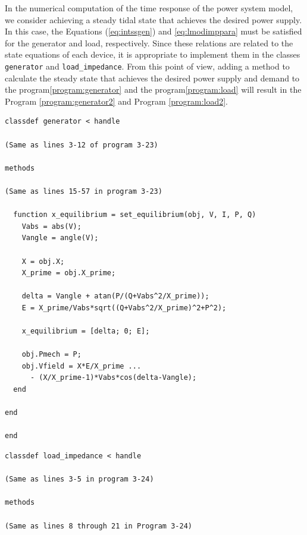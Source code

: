 \documentclass[tombow,dvipdfmx]{corona-a5-1.1}
\begin{document}
\begin{例}
In the numerical computation of the time response of the power system model, we consider achieving a steady tidal state that achieves the desired power supply.
In this case, the Equations (\ref{eq:intssgen}) and \ref{eq:lmodimppara} must be satisfied for the generator and load, respectively.
Since these relations are related to the state equations of each device, it is appropriate to implement them in the classes \verb|generator| and \verb|load_impedance|.
From this point of view, adding a method to calculate the steady state that achieves the desired power supply and demand to the program\ref{program:generator} and the program\ref{program:load} will result in the Program \nobreak\ref{program:generator2} and Program \ref{program:load2}.

\smallskip
\begin{PROGRAMA}[count,title={generator.m}]\label{program:generator2}
  \begin{verbatim}
classdef generator < handle
  
(Same as lines 3-12 of program 3-23)

methods

(Same as lines 15-57 in program 3-23)

  function x_equilibrium = set_equilibrium(obj, V, I, P, Q)
    Vabs = abs(V);
    Vangle = angle(V);
    
    X = obj.X;
    X_prime = obj.X_prime;
    
    delta = Vangle + atan(P/(Q+Vabs^2/X_prime));
    E = X_prime/Vabs*sqrt((Q+Vabs^2/X_prime)^2+P^2);
    
    x_equilibrium = [delta; 0; E];
    
    obj.Pmech = P;
    obj.Vfield = X*E/X_prime ...
      - (X/X_prime-1)*Vabs*cos(delta-Vangle);
  end

end
  
end
\end{verbatim}
\end{PROGRAMA}

\smallskip
\begin{PROGRAMA}[count,title={load\_impedance.m}]\label{program:load2}
\begin{verbatim}
classdef load_impedance < handle
  
(Same as lines 3-5 in program 3-24)

methods
  
(Same as lines 8 through 21 in Program 3-24)


\end{verbatim}
\end{PROGRAMA}
\end{例}
\end{document}
